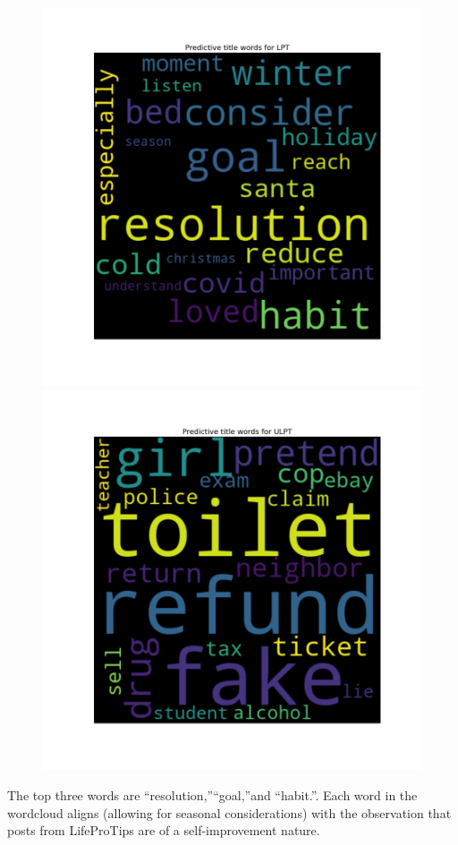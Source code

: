 \documentclass{amsart}
\theoremstyle{definition}
\theoremstyle{remark}
\newcommand{\tql}{\textquotedblleft}
\newcommand{\tqr}{\textquotedblright}
\begin{document}
\begin{figure}
\centering
\includegraphics[width=12cm]{LPT_title_wordcloud.jpeg}
\includegraphics[width=12cm]{ULPT_title_wordcloud.jpeg}
\label{lpt_wordcloud} 
\end{figure}
%
The top three words are \tql resolution,\tqr \tql goal,\tqr and \tql habit.\tqr. Each word in the wordcloud aligns (allowing for seasonal considerations) with the observation that posts from LifeProTips are of a self-improvement nature.
\end{document}
